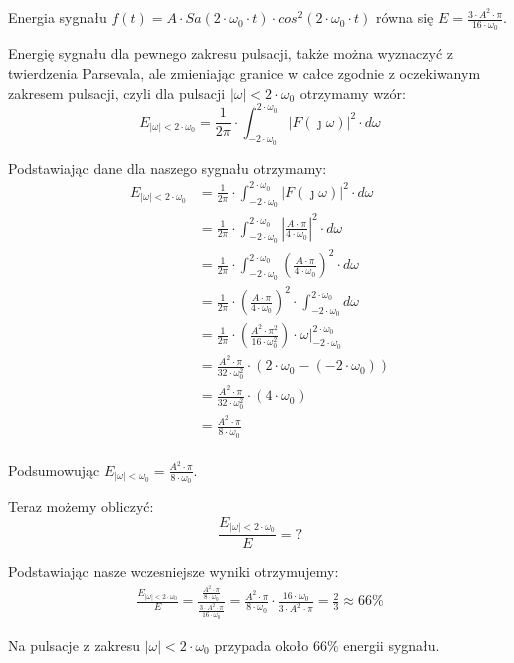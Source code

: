 \begin{task}
Energia sygnału $f(t)=A \cdot Sa\left(2 \cdot \omega_0 \cdot t\right) \cdot cos^2\left(2 \cdot \omega_0 \cdot t\right)$ równa się $E=\frac{3 \cdot A^2 \cdot \pi}{16 \cdot \omega_0}$.

Energię sygnału dla pewnego zakresu pulsacji, także można wyznaczyć z twierdzenia Parsevala, ale zmieniając granice w całce zgodnie z oczekiwanym zakresem pulsacji, czyli dla pulsacji $\left| \omega \right| < 2 \cdot \omega_0$ otrzymamy wzór:
\begin{equation}
E_{\left| \omega \right| < 2 \cdot \omega_0} = \frac{1}{2\pi} \cdot \int_{-2 \cdot \omega_0}^{2 \cdot \omega_0} \left|F(\jmath \omega)\right|^2 \cdot d\omega
\end{equation}

Podstawiając dane dla naszego sygnału otrzymamy:
\begin{align*}
E_{\left| \omega \right| < 2 \cdot \omega_0} &= \frac{1}{2\pi} \cdot \int_{-2 \cdot \omega_0}^{2 \cdot \omega_0} \left|F(\jmath \omega)\right|^2 \cdot d\omega\\
&= \frac{1}{2\pi} \cdot \int_{-2 \cdot \omega_0}^{2 \cdot \omega_0} \left|\frac{A \cdot \pi}{4 \cdot \omega_0}\right|^2 \cdot d\omega\\
&= \frac{1}{2\pi} \cdot \int_{-2 \cdot \omega_0}^{2 \cdot \omega_0} \left(\frac{A \cdot \pi}{4 \cdot \omega_0}\right)^2 \cdot d\omega\\
&= \frac{1}{2\pi} \cdot \left(\frac{A \cdot \pi}{4 \cdot \omega_0}\right)^2 \cdot \int_{-2 \cdot \omega_0}^{2 \cdot \omega_0} d\omega\\
&= \frac{1}{2\pi} \cdot \left(\frac{A^2 \cdot \pi^2}{16 \cdot \omega_0^2}\right) \cdot \left.\omega\right|_{-2 \cdot \omega_0}^{2 \cdot \omega_0}\\
&= \frac{A^2 \cdot \pi}{32 \cdot \omega_0^2} \cdot (2 \cdot \omega_0 - (-2 \cdot \omega_0))\\
&= \frac{A^2 \cdot \pi}{32 \cdot \omega_0^2} \cdot (4 \cdot \omega_0)\\
&= \frac{A^2 \cdot \pi}{8 \cdot \omega_0}\\
\end{align*}

Podsumowując $ E_{\left| \omega \right| < \omega_0} = \frac{A^2 \cdot \pi}{8 \cdot \omega_0}$.

Teraz możemy obliczyć:
\begin{equation}
\frac{E_{\left| \omega \right| < 2 \cdot \omega_0}}{E} = ?
\end{equation}

Podstawiając nasze wczesniejsze wyniki otrzymujemy:
\begin{align*}
\frac{E_{\left| \omega \right| < 2 \cdot \omega_0}}{E} = \frac{\frac{A^2 \cdot \pi}{8 \cdot \omega_0}}{\frac{3 \cdot A^2 \cdot \pi}{16 \cdot \omega_0}} =\frac{A^2 \cdot \pi}{8 \cdot \omega_0} \cdot \frac{16 \cdot \omega_0}{3 \cdot A^2 \cdot \pi} =\frac{2}{3} \approx 66\%
\end{align*}

Na pulsacje z zakresu $\left| \omega \right| < 2 \cdot \omega_0$ przypada około $66\%$ energii sygnału.

\end{task}

